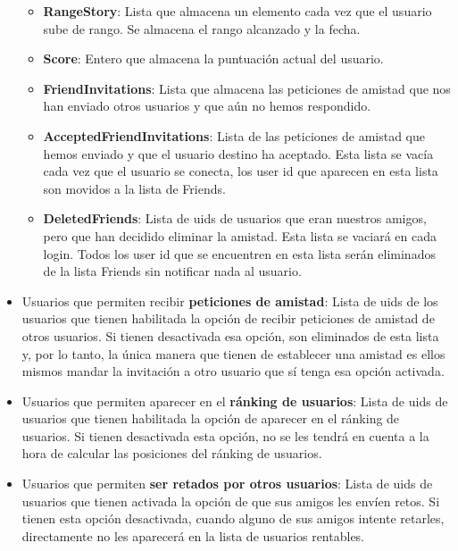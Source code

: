 \begin{itemize}
\begin{itemize}
    \item \textbf{RangeStory}: Lista que almacena un elemento cada vez que el usuario sube de rango. Se almacena el rango alcanzado y la fecha.
    
    \item \textbf{Score}: Entero que almacena la puntuación actual del usuario.

    \item \textbf{FriendInvitations}: Lista que almacena las peticiones de amistad que nos han enviado otros usuarios y que aún no hemos respondido.
    
    \item \textbf{AcceptedFriendInvitations}: Lista de las peticiones de amistad que hemos enviado y que el usuario destino ha aceptado. Esta lista se vacía cada vez que el usuario se conecta, los user id que aparecen en esta lista son movidos a la lista de Friends.
    
    \item \textbf{DeletedFriends}: Lista de uids de usuarios que eran nuestros amigos, pero que han decidido eliminar la amistad. Esta lista se vaciará en cada login. Todos los user id que se encuentren en esta lista serán eliminados de la lista Friends sin notificar nada al usuario.
    
    \end{itemize}

\item Usuarios que permiten recibir \textbf{peticiones de amistad}: Lista de uids de los usuarios que tienen habilitada la opción de recibir peticiones de amistad de otros usuarios. Si tienen desactivada esa opción, son eliminados de esta lista y, por lo tanto, la única manera que tienen de establecer una amistad es ellos mismos mandar la invitación a otro usuario que sí tenga esa opción activada.

\item Usuarios que permiten aparecer en el \textbf{ránking de usuarios}: Lista de uids de usuarios que tienen habilitada la opción de aparecer en el ránking de usuarios. Si tienen desactivada esta opción, no se les tendrá en cuenta a la hora de calcular las posiciones del ránking de usuarios.

\item Usuarios que permiten \textbf{ser retados por otros usuarios}: Lista de uids de usuarios que tienen activada la opción de que sus amigos les envíen retos. Si tienen esta opción desactivada, cuando alguno de sus amigos intente retarles, directamente no les aparecerá en la lista de usuarios rentables.

\end{itemize}


